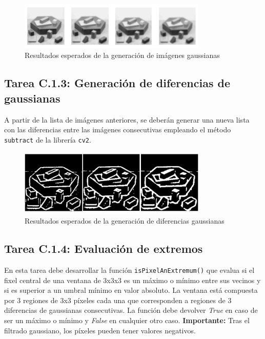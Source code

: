 \begin{figure}[h]
    \centering
    \includegraphics[width=0.8\textwidth]{Lab_3/template/figures/GaussianBlur.png}
    \caption{Resultados esperados de la generación de imágenes gaussianas}
    \label{fig:gauss_blur}
\end{figure}

\subsection*{Tarea C.1.3: Generación de diferencias de gaussianas}

A partir de la lista de imágenes anteriores, se deberán generar una nueva lista con las diferencias entre las imágenes consecutivas empleando el método \texttt{subtract} de la librería \texttt{cv2}.

\begin{figure}[h]
    \centering
    \includegraphics[width=0.8\textwidth]{Lab_3/template/figures/DoG.png}
    \caption{Resultados esperados de la generación de diferencias gaussianas}
    \label{fig:dog}
\end{figure}


\subsection*{Tarea C.1.4: Evaluación de extremos}

En esta tarea debe desarrollar la función \texttt{isPixelAnExtremum()} que evalua si el fixel central de una ventana de 3x3x3 es un máximo o mínimo entre sus vecinos y si es superior a un umbral mínimo en valor absoluto. La ventana está compuesta por 3 regiones de 3x3 píxeles cada una que corresponden a regiones de 3 diferencias de gaussianas consecutivas. La función debe devolver \textit{True} en caso de ser un máximo o mínimo y \textit{False} en cualquier otro caso. \textbf{Importante:} Tras el filtrado gaussiano, los píxeles pueden tener valores negativos.


